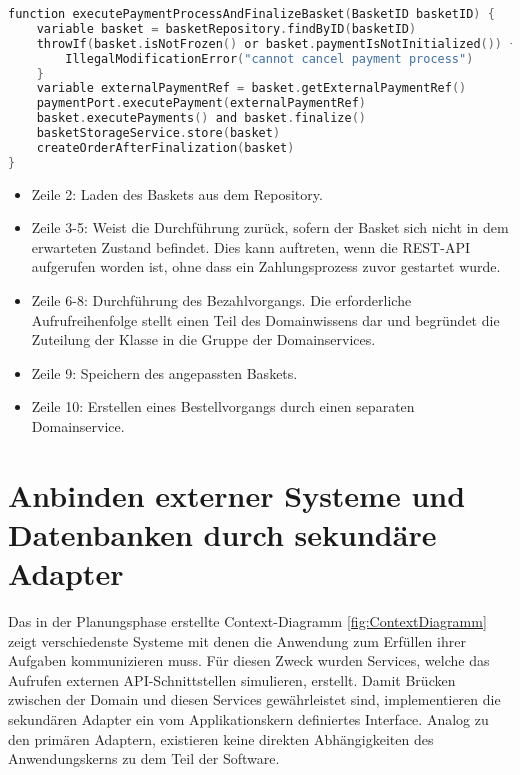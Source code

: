 \begin{minipage}{\linewidth} %
	\begin{lstlisting}[caption={Ausführung des Bezahlvorgangs in einem Domainservice}, label={lst:domainservice}, language=Kotlin]
function executePaymentProcessAndFinalizeBasket(BasketID basketID) {
	variable basket = basketRepository.findByID(basketID)
	throwIf(basket.isNotFrozen() or basket.paymentIsNotInitialized()) {
		IllegalModificationError("cannot cancel payment process")
	}
	variable externalPaymentRef = basket.getExternalPaymentRef()
	paymentPort.executePayment(externalPaymentRef)
	basket.executePayments() and basket.finalize()
	basketStorageService.store(basket)
	createOrderAfterFinalization(basket)
}
	\end{lstlisting}
	\begin{itemize}[noitemsep,nolistsep]
		\item Zeile 2: Laden des Baskets aus dem Repository.
		\item Zeile 3-5: Weist die Durchführung zurück, sofern der Basket sich nicht in dem erwarteten Zustand befindet. Dies kann auftreten, wenn die REST-API aufgerufen worden ist, ohne dass ein Zahlungsprozess zuvor gestartet wurde.
		\item Zeile 6-8: Durchführung des Bezahlvorgangs. Die erforderliche Aufrufreihenfolge stellt einen Teil des Domainwissens dar und begründet die Zuteilung der Klasse in die Gruppe der Domainservices.
		\item Zeile 9: Speichern des angepassten Baskets.
		\item Zeile 10: Erstellen eines Bestellvorgangs durch einen separaten Domainservice.
	\end{itemize}
\end{minipage}

\section{Anbinden externer Systeme und Datenbanken durch sekundäre Adapter}

Das in der Planungsphase erstellte Context-Diagramm \ref{fig:ContextDiagramm} zeigt verschiedenste Systeme mit denen die Anwendung zum Erfüllen ihrer Aufgaben kommunizieren muss. Für diesen Zweck wurden Services, welche das Aufrufen externen API-Schnittstellen simulieren, erstellt. Damit Brücken zwischen der Domain und diesen Services gewährleistet sind, implementieren die sekundären Adapter ein vom Applikationskern definiertes Interface. Analog zu den primären Adaptern, existieren keine direkten Abhängigkeiten des Anwendungskerns zu dem Teil der Software.

